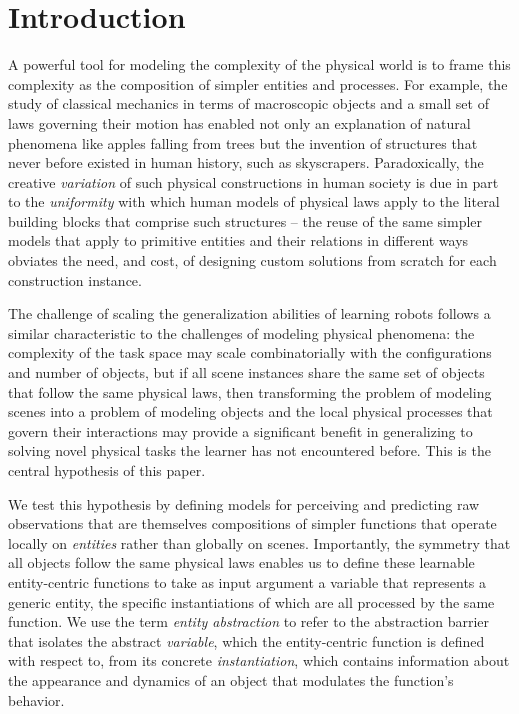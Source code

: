 \section{Introduction} \label{sec:intro}
A powerful tool for modeling the complexity of the physical world is to frame this complexity as the composition of simpler entities and processes.
For example, the study of classical mechanics in terms of macroscopic objects and a small set of laws governing their motion has enabled not only an explanation of natural phenomena like apples falling from trees but the invention of structures that never before existed in human history, such as skyscrapers.
Paradoxically, the creative \textit{variation} of such physical constructions in human society is due in part to the \textit{uniformity} with which human models of physical laws apply to the literal building blocks that comprise such structures -- the reuse of the same simpler models that apply to primitive entities and their relations in different ways obviates the need, and cost, of designing custom solutions from scratch for each construction instance.

The challenge of scaling the generalization abilities of learning robots follows a similar characteristic to the challenges of modeling physical phenomena: the complexity of the task space may scale combinatorially with the configurations and number of objects, but if all scene instances share the same set of objects that follow the same physical laws, then transforming the problem of modeling scenes into a problem of modeling objects and the local physical processes that govern their interactions may provide a significant benefit in generalizing to solving novel physical tasks the learner has not encountered before. This is the central hypothesis of this paper. 

We test this hypothesis by defining models for perceiving and predicting raw observations that are themselves compositions of simpler functions that operate locally on \textit{entities} rather than globally on scenes.
Importantly, the symmetry that all objects follow the same physical laws enables us to define these learnable entity-centric functions to take as input argument a variable that represents a generic entity, the specific instantiations of which are all processed by the same function.
We use the term \textit{entity abstraction} to refer to the abstraction barrier that isolates the abstract \textit{variable}, which the entity-centric function is defined with respect to, from its concrete \textit{instantiation}, which contains information about the appearance and dynamics of an object that modulates the function's behavior.

